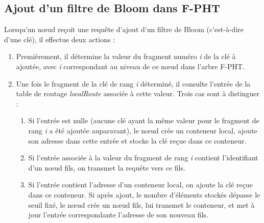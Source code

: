 \documentclass[a4paper,11pt]{report}
\begin{document}
\subsection{Ajout d'un filtre de Bloom dans F-PHT}
	Lorsqu'un nœud reçoit une requête d'ajout d'un filtre de Bloom (c'est-à-dire d'une clé), il effectue deux actions :
	\begin{enumerate}
		\item Premièrement, il détermine la valeur du fragment numéro \textit{i} de la clé à ajoutée, avec \textit{i} correspondant au niveau de ce nœud dans l'arbre F-PHT.
		\item Une fois le fragment de la clé de rang \textit{i} déterminé, il consulte l'entrée de la table de routage \textit{localRoute} associée à cette valeur. Trois cas sont à distinguer :
		\begin{enumerate}
			\item Si l'entrée est nulle (aucune clé ayant la même valeur pour le fragment de rang \textit{i} a été ajoutée auparavant), le nœud crée un conteneur local, ajoute son adresse dans cette entrée et stocke la clé reçue dans ce conteneur.
			\item Si l'entrée associée à la valeur du fragment de rang \textit{i} contient l'identifiant d'un nœud fils, on transmet la requête vers ce fils.
			\item Si l'entrée contient l'adresse d'un conteneur local, on ajoute la clé reçue dans ce conteneur. Si après ajout, le nombre d'éléments stockés dépasse le seuil fixé, le nœud crée un nœud fils, lui transmet le conteneur, et met à jour l'entrée correspondante l'adresse de son nouveau fils.
		\end{enumerate}
	\end{enumerate}
		
\end{document}
